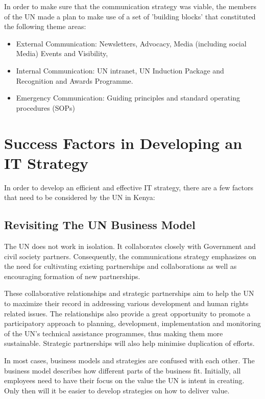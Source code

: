 \documentclass[12pt]{article}
\begin{document}
In order to make sure that the communication strategy was viable, the members of the UN made a plan to make use of a set of 'building blocks' that constituted the following theme areas:

\begin{itemize}
\item External Communication: Newsletters, Advocacy, Media (including social Media) Events and Visibility,
\item Internal Communication: UN intranet, UN Induction Package and Recognition and Awards Programme.
\item Emergency Communication: Guiding principles and standard operating procedures (SOPs)
\end{itemize}


\section*{Success Factors in Developing an IT Strategy}

In order to develop an efficient and effective IT strategy, there are a few factors that need to be considered by the UN in Kenya:

\subsection*{Revisiting The UN Business Model}
The UN does not work in isolation. It collaborates closely with Government and civil society partners. Consequently, the communications strategy emphasizes on the need for cultivating existing partnerships and collaborations as well as encouraging formation of new partnerships.

These collaborative relationships and strategic partnerships aim to help the UN to maximize their record in addressing various development and human rights related issues. The relationships also provide a great opportunity to promote a participatory approach to planning, development, implementation and monitoring of the UN’s technical assistance programmes, thus making them more sustainable. Strategic partnerships will also help minimise duplication of efforts.

In most cases, business models and strategies are confused with each other. The business model describes how different parts of the business fit. Initially, all employees need to have their focus on the value the UN is intent in creating. Only then will it be easier to develop strategies on how to deliver value.
\end{document}
